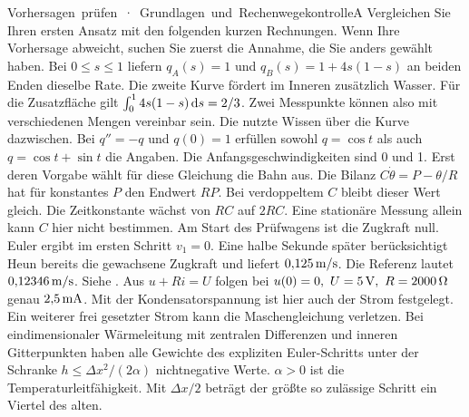 \unit{Vorhersagen prüfen · Grundlagen und Rechenwege}{kontrolleA}
\begingroup\fontsize{10}{13.0}\selectfont
Vergleichen Sie Ihren ersten Ansatz mit den folgenden kurzen Rechnungen. Wenn Ihre Vorhersage abweicht, suchen Sie zuerst die Annahme, die Sie anders gewählt haben.
\hypertarget{antwort1}{}Bei \(0\le s\le1\) liefern \(q_A(s)=1\) und \(q_B(s)=1+4s(1-s)\) an beiden Enden dieselbe Rate. Die zweite Kurve fördert im Inneren zusätzlich Wasser. Für die Zusatzfläche gilt \(\int_0^1 4s(1-s)\,\mathrm{d} s=2/3\). Zwei Messpunkte können also mit verschiedenen Mengen vereinbar sein. Die  nutzte Wissen über die Kurve dazwischen.
\hypertarget{antwort2}{}Bei \(q''=-q\) und \(q(0)=1\) erfüllen sowohl \(q=\cos t\) als auch \(q=\cos t+\sin t\) die Angaben. Die Anfangsgeschwindigkeiten sind 0 und 1. Erst deren Vorgabe wählt für diese Gleichung die Bahn aus.
\hypertarget{antwort3}{}Die Bilanz \(C\dot\theta=P-\theta/R\) hat für konstantes \(P\) den Endwert \(RP\). Bei verdoppeltem \(C\) bleibt dieser Wert gleich. Die Zeitkonstante wächst von \(RC\) auf \(2RC\). Eine stationäre Messung allein kann \(C\) hier nicht bestimmen.
\hypertarget{antwort4}{}Am Start des Prüfwagens ist die Zugkraft null. Euler ergibt im ersten Schritt \(v_1=0\). Eine halbe Sekunde später berücksichtigt Heun bereits die gewachsene Zugkraft und liefert \(0{,}125\,\mathrm{m/s}\). Die Referenz lautet \(0{,}12346\,\mathrm{m/s}\). Siehe .
\hypertarget{antwort5}{}Aus \(u+Ri=U\) folgen bei \(u(0)=0,\ U=5\unitm V,\ R=2000\,\Omega\) genau \(2{,}5\,\mathrm{mA}\). Mit der Kondensatorspannung ist hier auch der Strom festgelegt. Ein weiterer frei gesetzter Strom kann die Maschengleichung verletzen.
\hypertarget{antwort6}{}Bei eindimensionaler Wärmeleitung mit zentralen Differenzen und inneren Gitterpunkten haben alle Gewichte des expliziten Euler-Schritts unter der Schranke \(h\le\Delta x^2/(2\alpha)\) nichtnegative Werte. \(\alpha>0\) ist die Temperaturleitfähigkeit. Mit \(\Delta x/2\) beträgt der größte so zulässige Schritt ein Viertel des alten.
\endgroup

